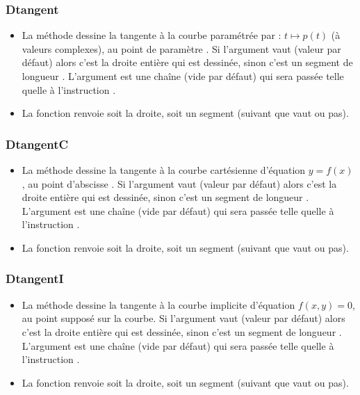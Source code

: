 \subsubsection{Dtangent}
\begin{itemize}
    \item La méthode  dessine la tangente à la courbe paramétrée par : \(t \mapsto p(t)\) (à valeurs complexes), au point de paramètre . Si l'argument  vaut \nil (valeur par défaut) alors c'est la droite entière qui est dessinée, sinon c'est un segment de longueur . L'argument  est une chaîne (vide par défaut) qui sera passée telle quelle à l'instruction \drawcmd.
    \item La fonction  renvoie soit la droite, soit un segment (suivant que  vaut \nil ou pas).
\end{itemize}

\subsubsection{DtangentC}
\begin{itemize}
    \item La méthode  dessine la tangente à la courbe cartésienne d'équation \(y=f(x)\), au point d'abscisse . Si l'argument  vaut \nil (valeur par défaut) alors c'est la droite entière qui est dessinée, sinon c'est un segment de longueur . L'argument  est une chaîne (vide par défaut) qui sera passée telle quelle à l'instruction \drawcmd.
    \item La fonction  renvoie soit la droite, soit un segment (suivant que  vaut \nil ou pas).
\end{itemize}

\subsubsection{DtangentI}
\begin{itemize}
    \item La méthode  dessine la tangente à la courbe implicite d'équation \(f(x,y)=0\), au point  supposé sur la courbe. Si l'argument  vaut \nil (valeur par défaut) alors c'est la droite entière qui est dessinée, sinon c'est un segment de longueur . L'argument  est une chaîne (vide par défaut) qui sera passée telle quelle à l'instruction \drawcmd.
    \item La fonction  renvoie soit la droite, soit un segment (suivant que  vaut \nil ou pas).
\end{itemize}

